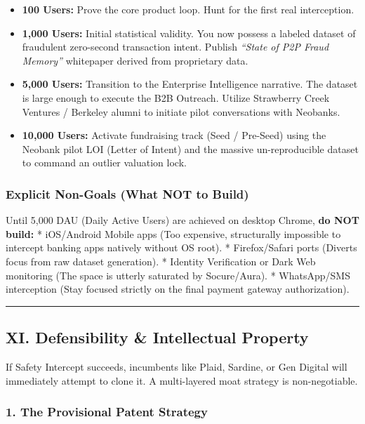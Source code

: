 \documentclass[
]{article}
\providecommand{\tightlist}{%
  \setlength{\itemsep}{0pt}\setlength{\parskip}{0pt}}
\begin{document}
\begin{itemize}
\tightlist
\item
  \textbf{100 Users:} Prove the core product loop. Hunt for the first
  real interception.
\item
  \textbf{1,000 Users:} Initial statistical validity. You now possess a
  labeled dataset of fraudulent zero-second transaction intent. Publish
  \emph{``State of P2P Fraud Memory''} whitepaper derived from
  proprietary data.
\item
  \textbf{5,000 Users:} Transition to the Enterprise Intelligence
  narrative. The dataset is large enough to execute the B2B Outreach.
  Utilize Strawberry Creek Ventures / Berkeley alumni to initiate pilot
  conversations with Neobanks.
\item
  \textbf{10,000 Users:} Activate fundraising track (Seed / Pre-Seed)
  using the Neobank pilot LOI (Letter of Intent) and the massive
  un-reproducible dataset to command an outlier valuation lock.
\end{itemize}

\subsubsection{Explicit Non-Goals (What NOT to
Build)}\label{explicit-non-goals-what-not-to-build}

Until 5,000 DAU (Daily Active Users) are achieved on desktop Chrome,
\textbf{do NOT build:} * iOS/Android Mobile apps (Too expensive,
structurally impossible to intercept banking apps natively without OS
root). * Firefox/Safari ports (Diverts focus from raw dataset
generation). * Identity Verification or Dark Web monitoring (The space
is utterly saturated by Socure/Aura). * WhatsApp/SMS interception (Stay
focused strictly on the final payment gateway authorization).

\begin{center}\rule{0.5\linewidth}{0.5pt}\end{center}

\subsection{XI. Defensibility \& Intellectual
Property}\label{xi.-defensibility-intellectual-property}

If Safety Intercept succeeds, incumbents like Plaid, Sardine, or Gen
Digital will immediately attempt to clone it. A multi-layered moat
strategy is non-negotiable.

\subsubsection{1. The Provisional Patent
Strategy}\label{the-provisional-patent-strategy}
\end{document}
